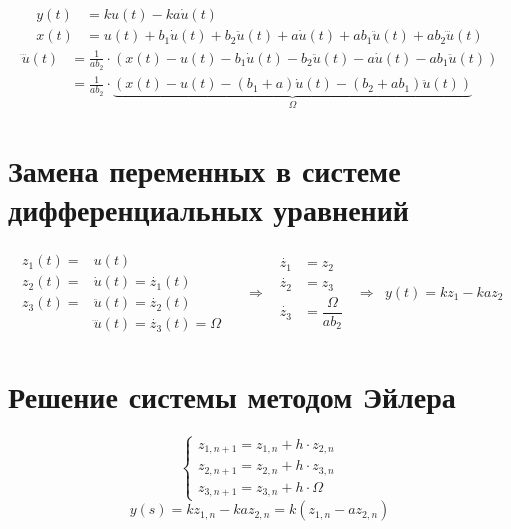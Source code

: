         \vspace{1cm}
        $$
            \begin{aligned}
                y(t) &= ku(t) - ka\dot{u}(t)
                \\
                x(t) &= u(t) + b_1\dot{u}(t) + b_2\ddot{u}(t) + a\dot{u}(t) + ab_1\ddot{u}(t) + ab_2\dddot{u}(t)
            \end{aligned}
        $$
        \vspace{1cm}
        $$
            \begin{aligned}
                \dddot{u}(t)
                &= \frac{1}{ab_2} \cdot (x(t) - u(t) - b_1\dot{u}(t) - b_2\ddot{u}(t) - a\dot{u}(t) - ab_1\ddot{u}(t))
                \\
                &= \frac{1}{ab_2} \cdot \underbrace{(x(t) - u(t) - (b_1 + a)\dot{u}(t) - (b_2 + ab_1)\ddot{u}(t))}_{\Omega}
            \end{aligned}
        $$

    \section{Замена переменных в системе дифференциальных уравнений}
        $$
            \begin{matrix}
                \begin{aligned}
                    z_1(t) = &u(t) &
                    \\
                    z_2(t) = &\dot{u}(t) = \dot{z_1}(t) &
                    \\
                    z_3(t) = &\ddot{u}(t) = \dot{z_2}(t) &
                    \\
                    &\dddot{u}(t) = \dot{z_3}(t) = \Omega &
                \end{aligned}
                &
                \Rightarrow
                &
                \begin{aligned}
                    \dot{z_1} &= z_2
                    \\
                    \dot{z_2} &= z_3
                    \\
                    \dot{z_3} &= \dfrac{\Omega}{ab_2}
                \end{aligned}
                &
                \Rightarrow
                &
                y(t) = kz_1 - kaz_2
            \end{matrix}
        $$

    \section{Решение системы методом Эйлера}
        $$
            \begin{cases}
                z_{1,n+1} = z_{1,n} + h \cdot z_{2,n}
                \\
                z_{2,n+1} = z_{2,n} + h \cdot z_{3,n}
                \\
                z_{3,n+1} = z_{3,n} + h \cdot \Omega
            \end{cases}
        $$
        $$
            y(s) = kz_{1,n} - kaz_{2,n} = k(z_{1,n} - az_{2,n})
        $$

